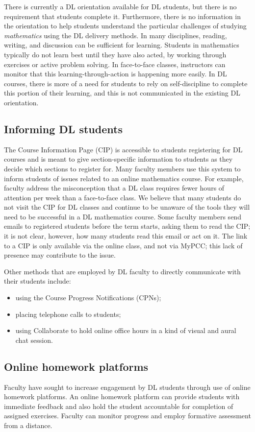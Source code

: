 There is currently a DL orientation available for DL students, but there is no requirement that students complete it.
Furthermore, there is no information in the orientation to help students understand the particular challenges of studying \emph{mathematics} using the DL delivery methods.
In many disciplines, reading, writing, and discussion can be sufficient for learning.
Students in mathematics typically do not learn best until they have also acted, by working through exercises or active problem solving.
In face-to-face classes, instructors can monitor that this learning-through-action is happening more easily.
In DL courses, there is more of a need for students to rely on self-discipline to complete this portion of their learning, and this is not communicated in the existing DL orientation.

\subsection{Informing DL students}
The Course Information Page (CIP) is accessible to students registering for DL courses and is meant to give section-specific information to students as they decide which sections to register for.
Many faculty members use this system to inform students of issues related to an online mathematics course.
For example, faculty address the misconception that a DL class requires fewer hours of attention per week than a face-to-face class.
We believe that many students do not visit the CIP for DL classes and continue to be unaware of the tools they will need to be successful in a DL mathematics course.
Some faculty members send emails to registered students before the term starts, asking them to read the CIP;  it is not clear, however, how many students read this email or act on it.
The link to a CIP is only available via the online class, and not via MyPCC; this lack of presence may contribute to the issue.

Other methods that are employed by DL faculty to directly communicate with their students include: \begin{itemize} \item using the Course Progress Notifications (CPNs); \item placing telephone calls to students; \item using Collaborate to hold online office hours in a kind of visual and aural chat session.
\end{itemize}

\subsection{Online homework platforms}
Faculty have sought to increase engagement by DL students through use of online homework platforms.
An online homework platform can provide students with immediate feedback and also hold the student accountable for completion of assigned exercises.
Faculty can monitor progress and employ formative assessment from a distance.


